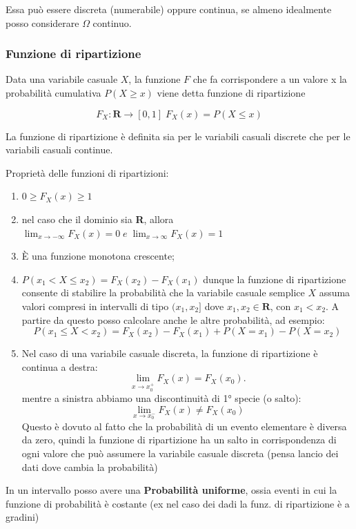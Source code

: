\documentclass{article}
\theoremstyle{remark}
\begin{document}
Essa può essere discreta (numerabile) oppure continua, se almeno idealmente posso considerare $\Omega$ continuo.

\subsubsection{Funzione di ripartizione}
Data una variabile casuale $X$, la funzione $F$ che fa corrispondere a un valore x la probabilità cumulativa $P(X \geq x)$ viene detta funzione di ripartizione

\[
F_X:\mathbf{R} \rightarrow [0,1] \; F_X(x)=P(X \leq x)
\]

La funzione di ripartizione è definita sia per le variabili casuali discrete che per le variabili casuali
continue.

Proprietà delle funzioni di ripartizioni:
\begin{enumerate}
    \item $0 \geq F_X(x) \geq 1$
    \item nel caso che il dominio sia \textbf{R}, allora $\displaystyle \lim_{x \rightarrow -\infty} F_X(x)=0 \; e \; \lim_{x \rightarrow \infty}F_X(x)=1$
    \item È una funzione monotona crescente;
    \item \( P(x_1 < X \leq x_2) = F_X(x_2) - F_X(x_1) \) dunque la funzione di ripartizione consente di stabilire la probabilità che la variabile casuale semplice \( X \) 
    assuma valori compresi in intervalli di tipo \((x_1, x_2]\) dove \( x_1, x_2 \in \mathbf{R} \), con \( x_1 < x_2 \). A partire da questo posso calcolare anche le altre probabilità, ad esempio:  
    \[ P(x_1 \leq X < x_2) = F_X(x_2) - F_X(x_1) + P(X = x_1) - P(X = x_2)\]
 
    \item Nel caso di una variabile casuale discreta, la funzione di ripartizione è continua a destra:  
    \[ \lim_{x \to x_0^+} F_X(x) = F_X(x_0).\]  
    mentre a sinistra abbiamo una discontinuità di 1° specie (o salto):  
    \[ \lim_{x \to x_0^-} F_X(x) \neq F_X(x_0)\]  
    Questo è dovuto al fatto che la probabilità di un evento elementare è diversa da zero, quindi la funzione di ripartizione ha un salto in corrispondenza di ogni valore che può assumere la variabile casuale discreta (pensa lancio dei dati dove cambia la probabilità)
\end{enumerate}

In un intervallo posso avere una \textbf{Probabilità uniforme}, ossia eventi in cui la funzione di probabilità è costante (ex nel caso dei dadi la funz. di ripartizione è a gradini)
\end{document}
